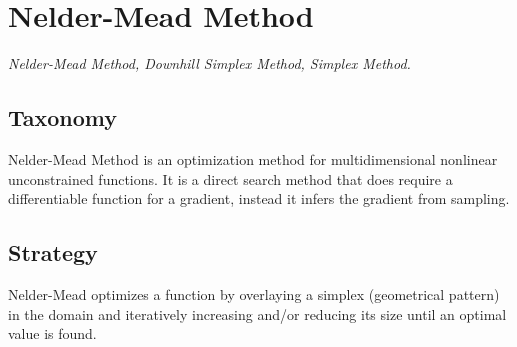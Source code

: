 
\section{Nelder-Mead Method} 
\label{sec:neldermead}

\emph{Nelder-Mead Method, Downhill Simplex Method, Simplex Method.}

\subsection{Taxonomy}
Nelder-Mead Method is an optimization method for multidimensional nonlinear unconstrained functions.
It is a direct search method that does require a differentiable function for a gradient, instead it infers the gradient from sampling.

\subsection{Strategy}
Nelder-Mead optimizes a function by overlaying a simplex (geometrical pattern) in the domain and iteratively increasing and/or reducing its size until an optimal value is found.

